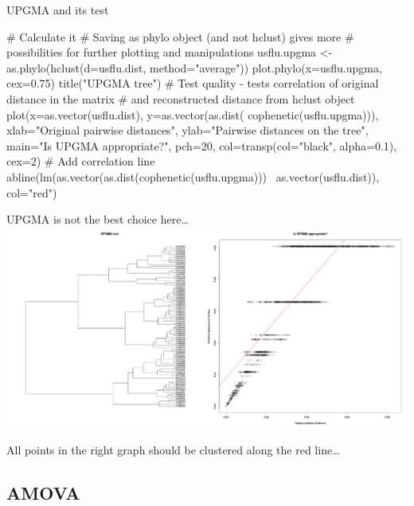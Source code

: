 \documentclass[compress, ucs, xelatex, 11pt, xcolor=svgnames,
  hyperref={
    bookmarks=true,
    unicode=true,
    colorlinks=true,
    pdftitle={Molecular data in R},
    plainpages=false,
    pdfauthor={Vojtech Zeisek},
    pdfsubject={Course about phylogeny and evolution in R},
    pdfcreator={XeLaTeX},
    pdfkeywords={R, evolution, phylogeny, molecular data},
    linkcolor=Tomato,
    anchorcolor=SaddleBrown,
    citecolor=Goldenrod,
    filecolor=DarkMagenta,
    menucolor=Sienna,
    urlcolor=DarkTurquoise,
    pdftex},
  url={hyphens, lowtilde} %
  ]{beamer}
\begin{document}
\begin{frame}[fragile]{UPGMA and its test}
  \begin{spluscode}
    # Calculate it
    # Saving as phylo object (and not hclust) gives more
    # possibilities for further plotting and manipulations
    usflu.upgma <- as.phylo(hclust(d=usflu.dist, method="average"))
    plot.phylo(x=usflu.upgma, cex=0.75)
    title("UPGMA tree")
    # Test quality - tests correlation of original distance in the matrix
    # and reconstructed distance from hclust object
    plot(x=as.vector(usflu.dist), y=as.vector(as.dist(
      cophenetic(usflu.upgma))), xlab="Original pairwise distances",
      ylab="Pairwise distances on the tree", main="Is UPGMA
      appropriate?", pch=20, col=transp(col="black",
      alpha=0.1), cex=2)
    # Add correlation line
    abline(lm(as.vector(as.dist(cophenetic(usflu.upgma)))~
      as.vector(usflu.dist)), col="red")
  \end{spluscode}
\end{frame}

\begin{frame}{UPGMA is not the best choice here\ldots}
\includegraphics[width=\textwidth]{upgma.png}

All points in the right graph should be clustered along the red line\ldots
\end{frame}

\subsection{AMOVA} %
\end{document}
